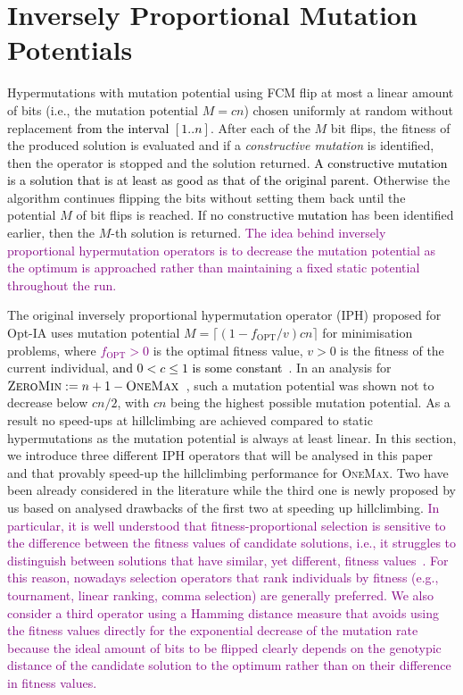 \documentclass[lettersize,journal]{IEEEtran}
\newcommand{\new}[1]{\textcolor{black}{#1}}
\newcommand{\rev}[1]{\textcolor{black}{#1}}
\newcommand{\rerev}[1]{\textcolor{purple}{#1}}
\newcommand{\IPHfcm}{IPH}
\begin{document}
 \section{Inversely Proportional Mutation Potentials} Hypermutations with mutation potential using FCM flip at most a linear amount of bits (i.e., the mutation potential $M=cn$) chosen uniformly at random without replacement \new{from the interval $[1..n]$}. After each of the $M$ bit flips, the fitness of the produced solution is evaluated and if a {\it constructive mutation} is identified, then the operator is stopped and the solution returned. \new{A  constructive mutation is a solution that is at least as good as that of the original parent.}
 Otherwise the algorithm continues flipping the bits without setting them back until the potential $M$ of bit flips is reached. If no constructive \new{mutation} has been identified earlier, then the $M$-th solution is returned.  
\rerev{The idea behind inversely proportional hypermutation operators is to decrease the mutation potential as the optimum is approached rather than maintaining a fixed static potential throughout the run.}

The original inversely proportional hypermutation operator (\IPHfcm{}) proposed for Opt-IA uses mutation potential  $M=\lceil(1-f_{\text{OPT}}/v)cn\rceil $ for minimisation problems, where \rerev{$f_{\text{OPT}} > 0$} is the optimal fitness value, $v>0$ is the fitness of the current individual, 
 \new{and $0<c\leq 1$ is some constant}~\cite{CutelloNicosiaPavoneTimmis2007,JansenZarges2011}. 
In an analysis for \rev{$\textsc{ZeroMin}:=n+1-\textsc {OneMax}$}~\cite{JansenZarges2011}, such a mutation potential was shown not to decrease below $cn/2$, with $cn$ being the highest possible mutation potential.
 	As a result no speed-ups at hillclimbing are achieved compared to static hypermutations as the mutation potential is always at least linear.
 In this section, we introduce three different IPH operators  that will be analysed in this paper and that provably speed-up the hillclimbing  performance for \textsc{OneMax}. Two have been already considered in the literature while the third one is newly proposed by us based on analysed drawbacks of the first two at speeding up hillclimbing.
 \rerev{In particular, it is well understood that fitness-proportional selection is sensitive to the difference between the fitness values of candidate solutions, i.e., it struggles to distinguish between solutions that have similar, yet different, fitness values~\cite{OlivetoWittTCS2014,OlivetoWitt2015,Whitley1989,NeumannOlivetoWitt2009}. For this reason, nowadays selection operators that rank individuals by fitness (e.g., tournament, linear ranking, comma selection) are generally preferred. We also consider a  third operator using a Hamming distance measure  that  avoids using the fitness values directly for the exponential decrease of the mutation rate because the ideal amount of bits to be flipped clearly depends on the genotypic distance of the candidate solution to the optimum rather than on their difference in fitness values.}
 	 
\end{document}
